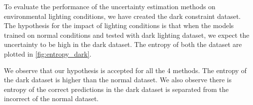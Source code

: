 To evaluate the performance of the uncertainty estimation methods on environmental lighting conditions, we have created the dark constraint dataset. The hypothesis for the impact of lighting conditions is that when the models trained on normal conditions and tested with dark lighting dataset,  we expect the uncertainty to be high in the dark dataset. The entropy of both the dataset are plotted in \cref{fig:entropy_dark}. 


We observe that our hypothesis is accepted for all the 4 methods. The entropy of the dark dataset is higher than the normal dataset. We also observe there is entropy of the correct predictions in the dark dataset is separated from the incorrect of the normal dataset. 


